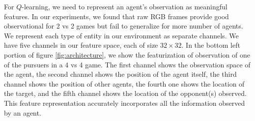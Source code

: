 \documentclass[conference]{IEEEtran}
\begin{document}
For $Q$-learning, we need to represent an agent's observation as meaningful features. In our experiments, we found that raw RGB frames provide good observational for 2 vs 2 games but fail to generalize for more number of agents. We represent each type of entity in our environment as separate channels. We have five channels in our feature space, each of size $32\times32$. In the bottom left portion of figure \ref{fig:architecture}, we show the featurization of observation of one of the pursuers in a 4 vs 4 game. The first channel shows the observation space of the agent, the second channel shows the position of the agent itself, the third channel shows the position of other agents, the fourth one shows the location of the target, and the fifth channel shows the location of the opponent(s) observed. This feature representation accurately incorporates all the information observed by an agent.
\end{document}
